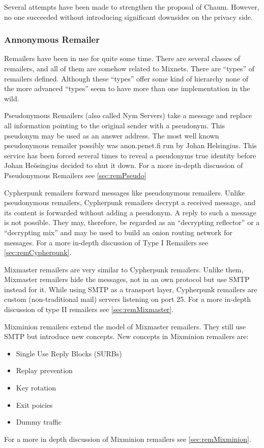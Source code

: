 Several attempts have been made to strengthen the proposal of Chaum\cite{golle:eurocrypt2004}\cite{disco}. However, no one succeeded without introducing significant downsides on the privacy side.
\subsubsection{Annonymous Remailer\label{sec:remailer}}
Remailers have been in use for quite some time. There are several classes of remailers, and all of them are somehow related to Mixnets. There are ``types'' of remailers defined. Although these ``types'' offer some kind of hierarchy none of the more advanced ``types'' seem to have more than one implementation in the wild. 

Pseudonymous Remailers (also called Nym Servers) take a message and replace all information pointing to the original sender with a pseudonym. This pseudonym may be used as an answer address. The most well known pseudonymous remailer possibly was anon.penet.fi run by Johan Helsingius. This service has been forced several times to reveal a pseudonyms true identity before Johan Heösingius decided to shut it down. For a more in-depth discussion of Pseudonymous Remailers see \ref{sec:remPseudo}

Cypherpunk remailers forward messages like pseudonymous remailers. Unlike pseudonymous remailers, Cypherpunk remailers decrypt a received message, and its content is forwarded without adding a pseudonym. A reply to such a message is not possible. They may, therefore, be regarded as an ``decrypting reflector'' or a ``decrypting mix'' and may be used to build an onion routing network for messages. For a more in-depth discussion of Type I Remailers see \ref{sec:remCypherpunk}.

Mixmaster remailers are very similar to Cypherpunk remailers. Unlike them, Mixmaster remailers hide the messages, not in an own protocol but use SMTP instead for it. While using SMTP as a transport layer, Cypherpunk remailers are custom (non-traditional mail) servers listening on port 25. For a more in-depth discussion of type II remailers see \ref{sec:remMixmaster}.

Mixminion remailers extend the model of Mixmaster remailers. They still use SMTP but introduce new concepts. New concepts in Mixminion remailers are:
\begin{itemize}
	\item Single Use Reply Blocks (SURBs)
	\item Replay prevention
	\item Key rotation
	\item Exit poicies
	\item Dummy traffic
\end{itemize}
For a more in depth discussion of Mixminion remailers see \ref{sec:remMixminion}.

